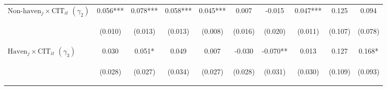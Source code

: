 \documentclass[twoside,a4paper,11pt]{article}
\begin{document}
\begin{table}
{\begin{tabular}{lccccccccc}
			 $\text{Non-haven}_j\times\text{CIT}_{it}$ $ (\gamma_2)$ & 0.056*** & 0.078*** & 0.058*** & 0.045*** & 0.007 & -0.015 & 0.047*** & 0.125 & 0.094 \\
			 \vspace{4pt} & \begin{footnotesize}(0.010)\end{footnotesize} & \begin{footnotesize}(0.013)\end{footnotesize} & \begin{footnotesize}(0.013)\end{footnotesize} & \begin{footnotesize}(0.008)\end{footnotesize} & \begin{footnotesize}(0.016)\end{footnotesize} & \begin{footnotesize}(0.020)\end{footnotesize} & \begin{footnotesize}(0.011)\end{footnotesize} & \begin{footnotesize}(0.107)\end{footnotesize} & \begin{footnotesize}(0.078)\end{footnotesize} \\
			 $\text{Haven}_j\times\text{CIT}_{it}$ $ (\gamma_3)$ & 0.030 & 0.051* & 0.049 & 0.007 & -0.030 & -0.070** & 0.013 & 0.127 & 0.168* \\
			 & \begin{footnotesize}(0.028)\end{footnotesize} & \begin{footnotesize}(0.027)\end{footnotesize} & \begin{footnotesize}(0.034)\end{footnotesize} & \begin{footnotesize}(0.027)\end{footnotesize} & \begin{footnotesize}(0.028)\end{footnotesize} & \begin{footnotesize}(0.031)\end{footnotesize} & \begin{footnotesize}(0.030)\end{footnotesize} & \begin{footnotesize}(0.109)\end{footnotesize} & \begin{footnotesize}(0.093)\end{footnotesize} \\

\end{tabular}}
\end{table}
\end{document}
